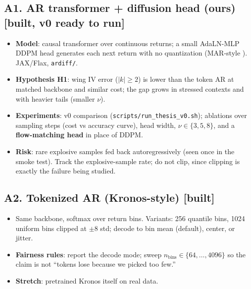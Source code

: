 \documentclass[10pt]{article}
\newcommand{\status}[1]{\textsf{\small[#1]}}
\begin{document}
\subsection{A1. AR transformer + diffusion head (ours) \status{built, v0 ready to run}}
\begin{itemize}
\item \textbf{Model}: causal transformer over continuous returns; a small AdaLN-MLP DDPM head generates each next
return with no quantization (MAR-style \cite{mar}). JAX/Flax, \texttt{ardiff/}.
\item \textbf{Hypothesis H1}: wing IV error ($|k|\ge2$) is lower than the token AR at matched backbone and similar
cost; the gap grows in stressed contexts and with heavier tails (smaller $\nu$).
\item \textbf{Experiments}: v0 comparison (\texttt{scripts/run\_thesis\_v0.sh}); ablations over sampling steps
(cost vs accuracy curve), head width, $\nu\in\{3,5,8\}$, and a \textbf{flow-matching head} in place of DDPM.
\item \textbf{Risk}: rare explosive samples fed back autoregressively (seen once in the smoke test). Track the
explosive-sample rate; do not clip, since clipping is exactly the failure being studied.
\end{itemize}

\subsection{A2. Tokenized AR (Kronos-style) \status{built}}
\begin{itemize}
\item Same backbone, softmax over return bins. Variants: 256 quantile bins, 1024 uniform bins clipped at $\pm8$ std;
decode to bin mean (default), center, or jitter.
\item \textbf{Fairness rules}: report the decode mode; sweep $n_{\text{bins}}\in\{64,\dots,4096\}$ so the claim is
not ``tokens lose because we picked too few.''
\item \textbf{Stretch}: pretrained Kronos \cite{kronos} itself on real data.
\end{itemize}
\end{document}
